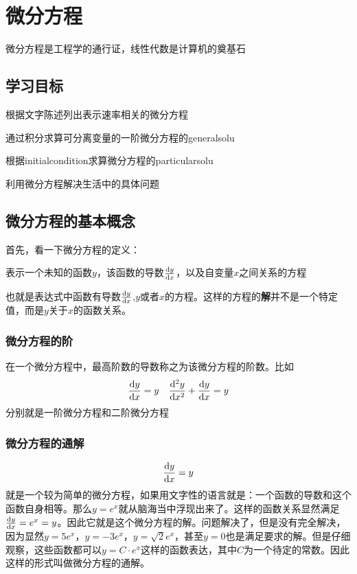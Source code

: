 \chapter{微分方程}
微分方程是工程学的通行证，线性代数是计算机的奠基石

\section*{学习目标}
\begin{todolist}
	\item 根据文字陈述列出表示速率相关的微分方程
	\item 通过积分求算可分离变量的一阶微分方程的\gls{generalsolu}
	\item 根据\gls{initialcondition}求算微分方程的\gls{particularsolu}
	\item 利用微分方程解决生活中的具体问题
\end{todolist}
\clearpage

\section{微分方程的基本概念}
首先，看一下微分方程的定义：
\begin{definition}
表示一个未知的函数$y$，该函数的导数$\frac{{\mathrm{d}} y}{{\mathrm{d}} x}$，以及自变量$x$之间关系的方程
\end{definition}
也就是表达式中函数有导数$\frac{{\mathrm{d}} y}{{\mathrm{d}} x}$,$y$或者$x$的方程。这样的方程的\textbf{解}并不是一个特定值，而是$y$关于$x$的函数关系。

\subsection*{微分方程的阶}
在一个微分方程中，最高阶数的导数称之为该微分方程的阶数。比如
\[
	\frac{{\mathrm{d}} y}{{\mathrm{d}} x}=y \quad \frac{{\mathrm{d}}^2 y}{{\mathrm{d}} x^2} +\frac{{\mathrm{d}} y}{{\mathrm{d}} x}=y
\]
分别就是一阶微分方程和二阶微分方程

\subsection*{微分方程的通解}
\[
	\frac{{\mathrm{d}} y}{{\mathrm{d}} x}=y
\]
就是一个较为简单的微分方程，如果用文字性的语言就是：一个函数的导数和这个函数自身相等。那么$y=e^x$就从脑海当中浮现出来了。这样的函数关系显然满足$\frac{{\mathrm{d}} y}{{\mathrm{d}} x}=e^x=y$。因此它就是这个微分方程的解。问题解决了，但是没有完全解决，因为显然$y=5e^x$，$y=-3e^x$，$y=\sqrt{2} e^x$，甚至$y=0$也是满足要求的解。但是仔细观察，这些函数都可以$y=C\cdot e^x$这样的函数表达，其中$C$为一个待定的常数。因此这样的形式叫做微分方程的通解。

